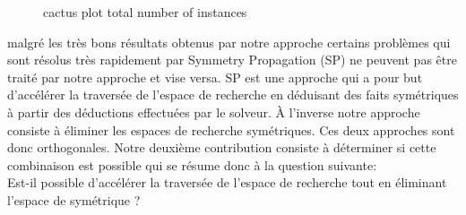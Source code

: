\begin{figure}[!htbp]
 \centering
 \qquad
 \caption{cactus plot  total number of instances}%
 \label{fig:frcactus}%
\end{figure}



malgré les très bons résultats obtenus par notre approche certains problèmes qui sont résolus très 
rapidement par Symmetry Propagation (SP) ne peuvent pas être traité par notre approche et vise versa.
SP est une approche qui a pour but d'accélérer la traversée de l'espace de recherche en déduisant des faits symétriques 
à partir des déductions effectuées par le solveur. À l'inverse notre approche consiste à éliminer les espaces de recherche 
symétriques. Ces deux approches sont donc orthogonales.
Notre deuxième contribution consiste à déterminer si cette combinaison est possible qui se résume donc à la question suivante:\\
Est-il possible d'accélérer la traversée de l'espace de recherche tout en éliminant l'espace de symétrique ?

